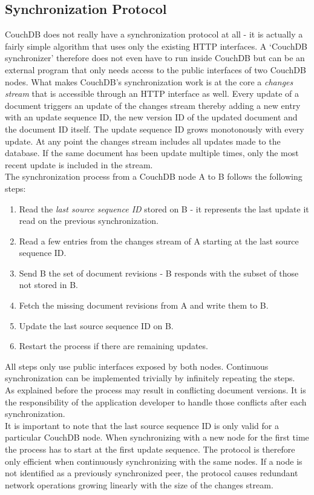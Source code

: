 \subsection{Synchronization Protocol}
CouchDB does not really have a synchronization protocol at all - it is actually a fairly simple algorithm that uses only the existing HTTP interfaces.
A `CouchDB synchronizer' therefore does not even have to run inside CouchDB but can be an external program that only needs access to the public interfaces of two CouchDB nodes.
What makes CouchDB's synchronization work is at the core a \emph{changes stream} that is accessible through an HTTP interface as well.
Every update of a document triggers an update of the changes stream thereby adding a new entry with an update sequence ID, the new version ID of the updated document and the document ID itself.
The update sequence ID grows monotonously with every update.
At any point the changes stream includes all updates made to the database.
If the same document has been update multiple times, only the most recent update is included in the stream.\\

The synchronization process from a CouchDB node A to B follows the following steps:

\begin{enumerate}
\item Read the \emph{last source sequence ID} stored on B - it represents the last update it read on the previous synchronization.
\item Read a few entries from the changes stream of A starting at the last source sequence ID.
\item Send B the set of document revisions - B responds with the subset of those not stored in B.
\item Fetch the missing document revisions from A and write them to B.
\item Update the last source sequence ID on B.
\item Restart the process if there are remaining updates.
\end{enumerate}

All steps only use public interfaces exposed by both nodes.
Continuous synchronization can be implemented trivially by infinitely repeating the steps.\\
As explained before the process may result in conflicting document versions.
It is the responsibility of the application developer to handle those conflicts after each synchronization.\\
It is important to note that the last source sequence ID is only valid for a particular CouchDB node.
When synchronizing with a new node for the first time the process has to start at the first update sequence.
The protocol is therefore only efficient when continuously synchronizing with the same nodes.
If a node is not identified as a previously synchronized peer, the protocol causes redundant network operations growing linearly with the size of the changes stream.

